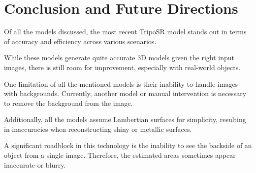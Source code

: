 
\section{Conclusion and Future Directions}
Of all the models discussed, the most recent TripoSR model stands out in terms of accuracy and efficiency across various scenarios.

While these models generate quite accurate 3D models given the right input images, there is still room for improvement, especially with real-world objects.

One limitation of all the mentioned models is their inability to handle images with backgrounds. Currently, another model or manual intervention is necessary to remove the background from the image.

Additionally, all the models assume Lambertian surfaces for simplicity, resulting in inaccuracies when reconstructing shiny or metallic surfaces.

A significant roadblock in this technology is the inability to see the backside of an object from a single image. Therefore, the estimated areas sometimes appear inaccurate or blurry.










